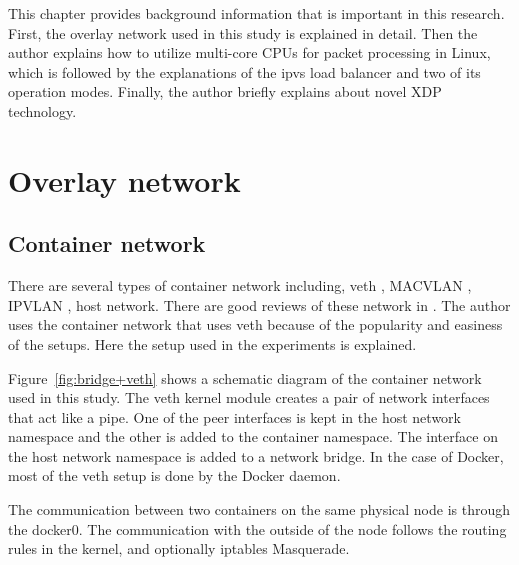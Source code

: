 
This chapter provides background information that is important in this research.
First, the overlay network used in this study is explained in detail.
Then the author explains how to utilize multi-core CPUs for packet processing in Linux,
which is followed by the explanations of the ipvs load balancer and two of its operation modes.
Finally, the author briefly explains about novel XDP technology.

\section{Overlay network}

\subsection{Container network}

There are several types of container network including, veth \cite{bhattiprolu2008virtual}, MACVLAN \cite{rathore2010performance}, IPVLAN \cite{ipvlan}, host network.
There are good reviews of these network in  \cite{Marmol2015,claassen2016linux,struye2017assessing}.
The author uses the container network that uses veth because of the popularity and easiness of the setups.
Here the setup used in the experiments is explained.

Figure~\ref{fig:bridge+veth} shows a schematic diagram of the container network used in this study.
The veth kernel module creates a pair of network interfaces that act like a pipe.
One of the peer interfaces is kept in the host network namespace and the other is added to the container namespace.
The interface on the host network namespace is added to a network bridge.
In the case of Docker, most of the veth setup is done by the Docker daemon.

The communication between two containers on the same physical node is through the docker0.
The communication with the outside of the node follows the routing rules in the kernel, and optionally iptables Masquerade.  

